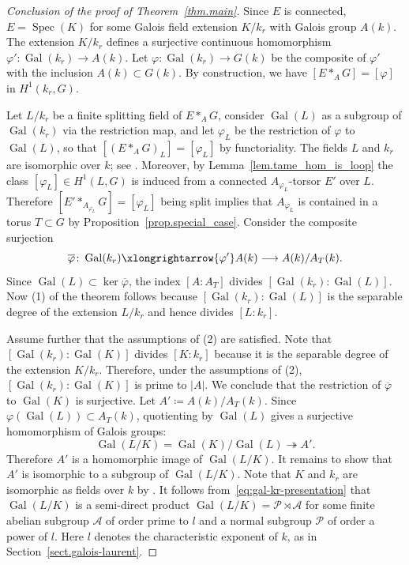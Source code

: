 \documentclass[12pt]{amsart}
\numberwithin{equation}{section}
\theoremstyle{remark}
\newcommand{\ol}{\overline}
\newcommand{\vphi}{\varphi}
\newcommand{\Gal}{\operatorname{Gal}}
\newcommand{\Spec}{\operatorname{Spec}}
\begin{document}
\begin{proof}[Conclusion of the proof of Theorem~\ref{thm.main}]
Since $E$ is connected, $E = \Spec(K)$ for some Galois field extension $K/k_r$ with Galois group $A(k)$. The extension $K/k_r$ defines a surjective continuous homomorphism $\vphi'\colon\Gal(k_r)\to A(k)$. Let $\vphi\colon\Gal(k_r) \to G(k)$ be the composite of $\vphi'$ with the inclusion $A(k) \subset G(k)$. By construction, we have $[E*_AG] = [\vphi]$ in $H^1(k_r,G)$.

Let $L/k_r$ be a finite splitting field of $E*_AG$, consider $\Gal(L)$ as a subgroup of $\Gal(k_r)$ via the restriction map, and let $\vphi_L$ be the restriction of $\vphi$ to $\Gal(L)$, so that $[(E*_AG)_L] = [\vphi_{L}]$ by functoriality. The fields $L$ and $k_r$ are isomorphic over $k$; see \cite[Corollary 5.4]{gille2009lower}. Moreover, by Lemma~\ref{lem.tame_hom_is_loop} the class $[\vphi_{L}]\in H^1(L,G)$ is induced from a connected $A_{\vphi_L}$-torsor $E'$ over $L$.  Therefore $[E'\ast_{A_{\vphi_L}}G] = [\vphi_{L}]$ being split implies that $A_{\vphi_L}$ is contained in a torus $T \subset G$ by Proposition~\ref{prop.special_case}. Consider the composite surjection
$$\overline{\vphi}\colon \Gal(k_r) \xlongrightarrow{\vphi'} A(k) \longrightarrow A(k)/A_T(k).$$
Since $\Gal(L) \subset \ker \overline{\vphi}$, the index $[A:A_T]$ divides $[\Gal(k_r):\Gal(L)]$. Now (1) of the theorem follows because $[\Gal(k_r):\Gal(L)]$ is the separable degree of the extension $L/k_r$ and hence divides $[L:k_r]$.

\smallskip
Assume further that the assumptions of (2) are satisfied. Note that $[\Gal(k_r):\Gal(K)]$ divides $[K:k_r]$ because it is the separable degree of the extension $K/k_r$. Therefore, under the assumptions of (2), $[\Gal(k_r):\Gal(K)]$ is prime to $|A|$. We conclude that the restriction of $\ol{\vphi}$ to $\Gal(K)$ is surjective. Let $A'\coloneqq A(k)/A_T(k)$. Since $\vphi(\Gal(L))\subset A_T(k)$, quotienting by $\Gal(L)$ gives a surjective homomorphism of Galois groups:
\begin{equation}\label{e.A/A_T_is_quotient}
    \Gal(L/K) = \Gal(K)/\Gal(L) \twoheadrightarrow  A'.
\end{equation}
Therefore $A'$ is a homomorphic image of $\Gal(L/K)$. It remains to show that $A'$ is isomorphic to a subgroup of $\Gal(L/K)$. Note that $K$ and $k_r$ are isomorphic as fields over $k$ by \cite[Corollary 6.4]{gille2009lower}.
It follows from~\eqref{eq:gal-kr-presentation}
that $\Gal(L/K)$ is a semi-direct product $\Gal(L/K) = \mathcal{P} \rtimes \mathcal{A}$ for some finite abelian subgroup $\mathcal{A}$ of order prime to $l$ and a normal subgroup $\mathcal{P}$ of order a power of $l$. Here $l$ denotes the characteristic exponent of $k$, as in
Section~\ref{sect.galois-laurent}. 


\end{proof}
\end{document}
